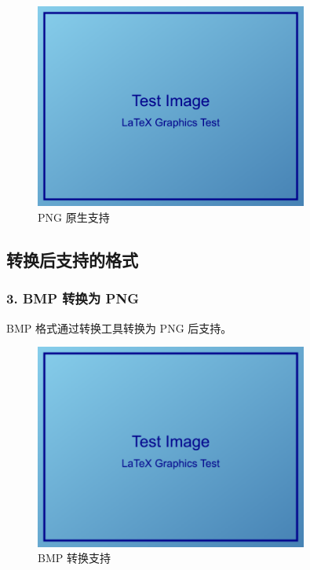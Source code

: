 \documentclass[UTF8, a4paper, 12pt]{ctexart}
\begin{document}
\begin{figure}[H]
    \centering
    \includegraphics[width=0.8\textwidth]{../../tests/images/test_image.png}
    \caption{PNG 原生支持}
    \label{fig:png_____}
\end{figure}



\subsection{转换后支持的格式}


\subsubsection{3. BMP 转换为 PNG}

BMP 格式通过转换工具转换为 PNG 后支持。


\begin{figure}[H]
    \centering
    \includegraphics[width=0.8\textwidth]{../../tests/images/converted/test_image.png}
    \caption{BMP 转换支持}
    \label{fig:bmp_____}
\end{figure}
\end{document}
